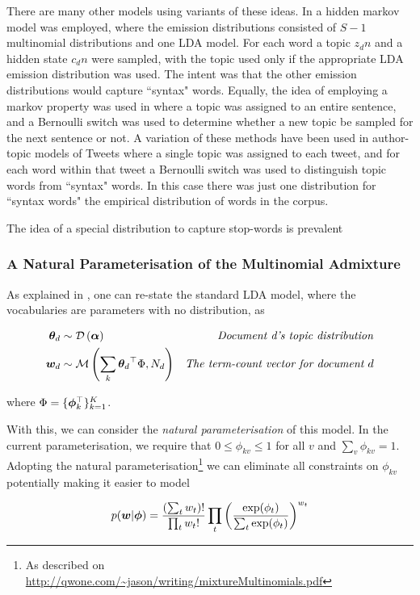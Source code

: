 There are many other models using variants of these ideas. In \cite{Griffiths2005} a hidden markov model was employed, where the emission distributions consisted of $S-1$ multinomial distributions and one LDA model. For each word a topic $z_dn$ and a hidden state $c_dn$ were sampled, with the topic used only if the appropriate LDA emission distribution was used. The intent was that the other emission distributions would capture ``syntax" words. Equally, the idea of employing a markov property was used in \cite{Gruber2007} where a topic was assigned to an entire sentence, and a Bernoulli switch was used to determine whether a new topic be sampled for the next sentence or not. A variation of these methods have been used in author-topic models\cite{RosenZvi2004} of Tweets\cite{Zhao2011}\cite{Zhao2011a} where a single topic was assigned to each tweet, and for each word within that tweet a Bernoulli switch was used to distinguish topic words from ``syntax" words. In this case there was just one distribution for ``syntax words" the empirical distribution of words in the corpus.

The idea of a special distribution to capture stop-words is prevalent


\subsubsection{A Natural Parameterisation of the Multinomial Admixture}
As explained in \cite{Buntine2002}, one can re-state the standard LDA model, where the vocabularies are parameters with no distribution, as

\begin{align}
{  \bm \theta _d } & \sim \mathcal{D} \left( {\bm \alpha} \right) & \text{\emph{Document d's topic distribution}} \\
\bm w_d & \sim \mathcal{M} \left( {\sum_k { \bm \theta_d }^\top\Phi},{N_d} \right) & \text{\emph{The term-count vector for document $d$}} \label{eqn:lda_convex_combo}
\end{align}

where $\Phi = \{\bm \phi_k^\top\}_{k=1}^{K}$.

With this, we can consider the \emph{natural parameterisation} of this model. In the current parameterisation, we require that $0 \leq \phi_{kv} \leq 1$ for all $v$ and $\sum_v \phi_{kv} = 1$. Adopting the natural parameterisation\footnote{As described on \url{http://qwone.com/~jason/writing/mixtureMultinomials.pdf}} we can eliminate all constraints on $\phi_{kv}$ potentially making it easier to model

\begin{align}
p(\bm w|\bm \phi) = \frac{(\sum_t w_t)!}{\prod_t w_t !} 
\prod_t \left(   
    \frac{\exp(\phi_t)}{\sum_t \exp(\phi_t)}
\right)^{w_t}
\end{align}


